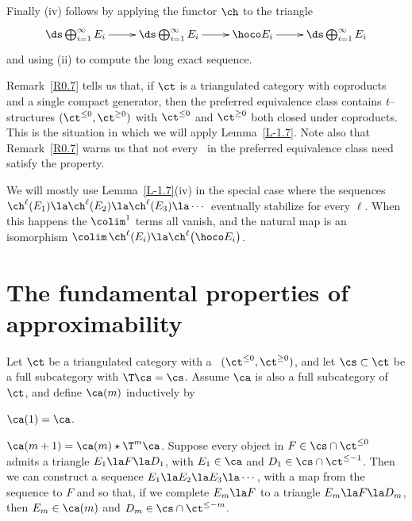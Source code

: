 \documentclass[11pt]{amsart}
\begin{document}
 Finally (iv) follows by applying the functor $\ch$ to
 the triangle
\[\xymatrix{
  \ds\bigoplus_{i=1}^\infty E_i\ar[r] &
  \ds\bigoplus_{i=1}^\infty E_i\ar[r] &
\hoco E_i \ar[r] &
  \ds\bigoplus_{i=1}^\infty E_i
}\]
and using (ii) to compute the long exact sequence.
\eprf

Remark~\ref{R0.7} tells us that, if $\ct$ is a triangulated category
with coproducts and a single compact generator, then the preferred
equivalence class contains {\it t}--structures $(\ct^{\leq0},\ct^{\geq0})$
with $\ct^{\leq0}$ and $\ct^{\geq0}$ both closed under coproducts.
This is the situation in which we will apply Lemma~\ref{L-1.7}.
Note also that Remark~\ref{R0.7} warns us that not every \tstr\ in
the preferred equivalence class need satisfy the property.

We will mostly use Lemma~\ref{L-1.7}(iv) in the special case where
the sequences $\ch^\ell(E_1)\la\ch^\ell(E_2)\la\ch^\ell(E_3)\la\cdots$
eventually stabilize for every $\ell$.
When this happens the $\colim^1$ terms all vanish,
and the natural map is an isomorphism
$\colim\, \ch^\ell(E_i)\la
\ch^\ell\big(\hoco E_i\big)$.
\ermk


\section{The fundamental properties of approximability}
\label{S17}




Let $\ct$ be a triangulated category
with a \tstr\ $(\ct^{\leq0},\ct^{\geq0})$, and let $\cs\subset\ct$ be a full
subcategory with $\T\cs=\cs$. Assume $\ca$ is also a full subcategory
of $\ct$, and define $\ca(m)$ inductively by
\be
\item
  $\ca(1)=\ca$.
\item
  $\ca(m+1)=\ca(m)\star\T^{m}\ca$.
\ee
Suppose every object in $F\in\cs\cap\ct^{\leq0}$ admits a
triangle $E_1\la F\la D_1$,
with $E_1\in\ca$ and $D_1\in\cs\cap\ct^{\leq-1}$. Then
we can construct a sequence $E_1\la E_2\la E_3\la\cdots$, with a
map from the sequence to $F$ and so that, if we complete $E_m\la F$
to a triangle $E_m\la F\la D_m$,
then $E_m\in\ca(m)$ and $D_m\in\cs\cap\ct^{\leq-m}$.
\elem
\end{document}

